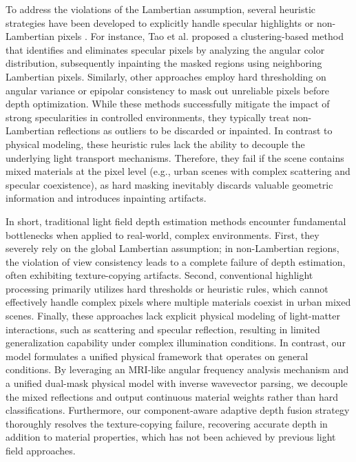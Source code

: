 To address the violations of the Lambertian assumption, several heuristic strategies have been developed to explicitly handle specular highlights or non-Lambertian pixels \cite{specularhighlightremovalnon}. For instance, Tao et al. \cite{Taospecularremovallightfie} proposed a clustering-based method that identifies and eliminates specular pixels by analyzing the angular color distribution, subsequently inpainting the masked regions using neighboring Lambertian pixels. Similarly, other approaches \cite{heuristicmasklightfieldrob} employ hard thresholding on angular variance or epipolar consistency to mask out unreliable pixels before depth optimization. While these methods successfully mitigate the impact of strong specularities in controlled environments, they typically treat non-Lambertian reflections as outliers to be discarded or inpainted. In contrast to physical modeling, these heuristic rules lack the ability to decouple the underlying light transport mechanisms. Therefore, they fail if the scene contains mixed materials at the pixel level (e.g., urban scenes with complex scattering and specular coexistence), as hard masking inevitably discards valuable geometric information and introduces inpainting artifacts.

In short, traditional light field depth estimation methods encounter fundamental bottlenecks when applied to real-world, complex environments. First, they severely rely on the global Lambertian assumption; in non-Lambertian regions, the violation of view consistency leads to a complete failure of depth estimation, often exhibiting texture-copying artifacts. Second, conventional highlight processing primarily utilizes hard thresholds or heuristic rules, which cannot effectively handle complex pixels where multiple materials coexist in urban mixed scenes. Finally, these approaches lack explicit physical modeling of light-matter interactions, such as scattering and specular reflection, resulting in limited generalization capability under complex illumination conditions. In contrast, our model formulates a unified physical framework that operates on general conditions. By leveraging an MRI-like angular frequency analysis mechanism and a unified dual-mask physical model with inverse wavevector parsing, we decouple the mixed reflections and output continuous material weights rather than hard classifications. Furthermore, our component-aware adaptive depth fusion strategy thoroughly resolves the texture-copying failure, recovering accurate depth in addition to material properties, which has not been achieved by previous light field approaches.


